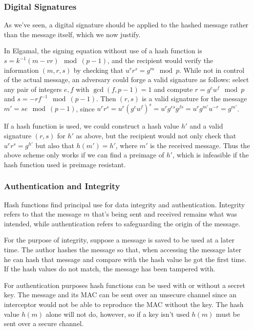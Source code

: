 \documentclass[a4paper,12pt]{article}
\begin{document}
\subsubsection{Digital Signatures}

As we've seen, a digital signature should be applied to the hashed message rather than the message itself, which we now justify. \cite[p. 455]{menezes}

In Elgamal, the signing equation without use of a hash function is $s = k^{-1}(m-vr) \mod (p-1)$, and the recipient would verify the information $(m,r,s)$ by checking that $u^r r^s = g^m \mod p$. While not in control of the actual message, an adversary could forge a valid signature as follows: select any pair of integers $e,f$ with $\gcd(f,p-1)=1$ and compute $r = g^e u^f \mod p$ and $s = -rf^{-1} \mod (p-1)$. Then $(r,s)$ is a valid signature for the message $m' = se \mod (p-1)$, since $u^r r^s = u^r (g^e u^f)^s = u^r g^{es} g^{fs} = u^r g^{m'} u^{-r} = g^{m'}$.

If a hash function is used, we could construct a hash value $h'$ and a valid signature $(r,s)$ for $h'$ as above, but the recipient would not only check that $u^r r^s = g^{h'}$ but also that $h(m') = h'$, where $m'$ is the received message. Thus the above scheme only works if we can find a preimage of $h'$, which is infeasible if the hash function used is preimage resistant.

\subsubsection{Authentication and Integrity}

Hash functions find principal use for data integrity and authentication. Integrity refers to that the message $m$ that's being sent and received remains what was intended, while authentication refers to safeguarding the origin of the message.

For the purpose of integrity, suppose a message is saved to be used at a later time. The author hashes the message so that, when accessing the message later he can hash that message and compare with the hash value he got the first time. If the hash values do not match, the message has been tampered with. \cite[p. 324]{menezes}

For authentication purposes hash functions can be used with or without a secret key. The message and its MAC can be sent over an unsecure channel since an interceptor would not be able to reproduce the MAC without the key. The hash value $h(m)$ alone will not do, however, so if a key isn't used $h(m)$ must be sent over a secure channel. \cite[p. 364]{menezes}
\end{document}
